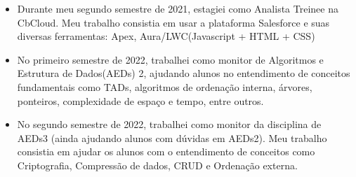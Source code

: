 \documentclass[10pt,a4paper,ragged2e]{altacv}
\begin{document}
{}
\begin{itemize}
\item Durante meu segundo semestre de 2021, estagiei como Analista Treinee na CbCloud. Meu trabalho consistia em usar a 
plataforma Salesforce e suas diversas ferramentas: Apex, Aura/LWC(Javascript + HTML + CSS) 
\end{itemize}
\begin{itemize}
\item No primeiro semestre de 2022, trabalhei como monitor de Algoritmos e Estrutura de Dados(AEDs) 2, ajudando alunos no 
entendimento de conceitos fundamentais como TADs, algoritmos de ordenação interna, árvores, ponteiros, 
complexidade de espaço e tempo, entre outros.
\item No segundo semestre de 2022, trabalhei como monitor da disciplina de AEDs3 
(ainda ajudando alunos com dúvidas em AEDs2). Meu trabalho consistia em ajudar os alunos 
com o entendimento de conceitos como Criptografia, Compressão de dados, 
CRUD e Ordenação externa.  
\end{itemize}

\divider



\end{document}
